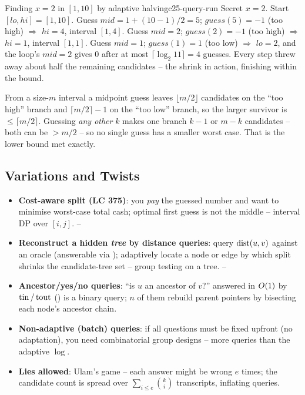 \begin{example}{Finding $x=2$ in $[1,10]$ by adaptive halving}{c25-query-run}
Secret $x=2$. Start $[\mathit{lo},\mathit{hi}]=[1,10]$.
Guess $\mathit{mid}=1{+}(10{-}1)/2=5$; $\mathit{guess}(5)=-1$ (too high) $\Rightarrow$
$\mathit{hi}=4$, interval $[1,4]$. Guess $\mathit{mid}=2$; $\mathit{guess}(2)=-1$ (too high)
$\Rightarrow$ $\mathit{hi}=1$, interval $[1,1]$. Guess $\mathit{mid}=1$; $\mathit{guess}(1)=1$
(too low) $\Rightarrow$ $\mathit{lo}=2$, and the loop's $\mathit{mid}=2$ gives $0$ after at most
$\lceil\log_2 11\rceil=4$ guesses. Every step threw away about half the remaining candidates -- the
 shrink in action, finishing within the  bound.
\end{example}
\begin{tracebox}
From a size-$m$ interval a midpoint guess leaves $\lfloor m/2\rfloor$ candidates on the ``too high''
branch and $\lceil m/2\rceil-1$ on the ``too low'' branch, so the larger survivor is $\le\lceil m/2\rceil$.
Guessing \emph{any other} $k$ makes one branch $k-1$ or $m-k$ candidates -- both can be $>m/2$ --
so no single guess has a smaller worst case. That is the  lower bound met exactly.
\end{tracebox}

\subsection{Variations and Twists}

\begin{itemize}[nosep]
  \item \textbf{Cost-aware split (LC 375)}: you \emph{pay} the guessed number and want to minimise
        worst-case total cash; optimal first guess is not the middle -- interval DP over
        $[i,j]$. \hfill{}--
  \item \textbf{Reconstruct a hidden \emph{tree} by distance queries}: query $\operatorname{dist}(u,v)$ against an
        oracle (answerable via ); adaptively locate a node or edge by which split shrinks
        the candidate-tree set -- group testing on a tree. \hfill{}--
  \item \textbf{Ancestor/yes/no queries}: ``is $u$ an ancestor of $v$?'' answered in $O(1)$ by
        $\operatorname{tin}/\operatorname{tout}$ () is a binary query; $n$ of them rebuild parent pointers by
        bisecting each node's ancestor chain. \hfill{}
  \item \textbf{Non-adaptive (batch) queries}: if all questions must be fixed upfront (no adaptation),
        you need combinatorial group designs -- more queries than the adaptive $\log$. \hfill{}
  \item \textbf{Lies allowed}: Ulam's game -- each answer might be wrong $e$ times; the candidate
        count is spread over $\sum_{i\le e}\binom{k}{i}$ transcripts, inflating queries. \hfill{}
\end{itemize}


